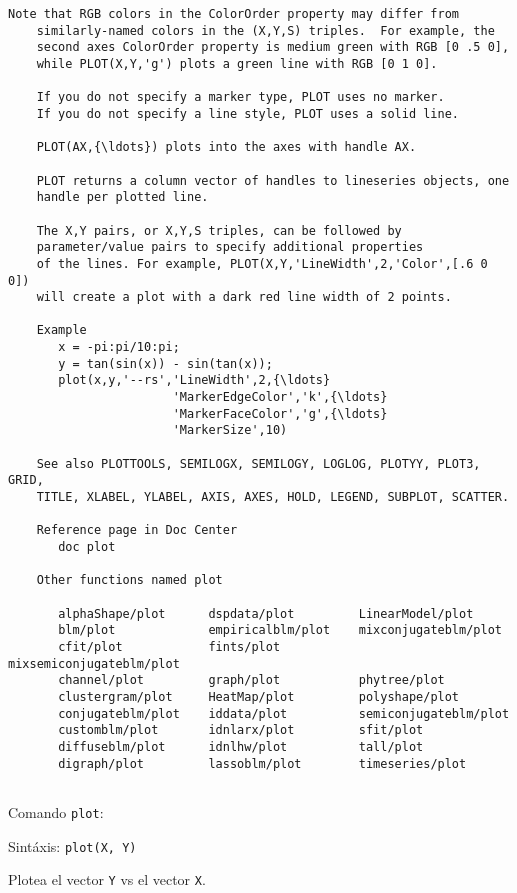 \documentclass[11pt]{article}
\begin{document}
\begin{Verbatim}[commandchars=\\\{\}]
    Note that RGB colors in the ColorOrder property may differ from
    similarly-named colors in the (X,Y,S) triples.  For example, the 
    second axes ColorOrder property is medium green with RGB [0 .5 0],
    while PLOT(X,Y,'g') plots a green line with RGB [0 1 0].
 
    If you do not specify a marker type, PLOT uses no marker. 
    If you do not specify a line style, PLOT uses a solid line.
 
    PLOT(AX,{\ldots}) plots into the axes with handle AX.
 
    PLOT returns a column vector of handles to lineseries objects, one
    handle per plotted line. 
 
    The X,Y pairs, or X,Y,S triples, can be followed by 
    parameter/value pairs to specify additional properties 
    of the lines. For example, PLOT(X,Y,'LineWidth',2,'Color',[.6 0 0]) 
    will create a plot with a dark red line width of 2 points.
 
    Example
       x = -pi:pi/10:pi;
       y = tan(sin(x)) - sin(tan(x));
       plot(x,y,'--rs','LineWidth',2,{\ldots}
                       'MarkerEdgeColor','k',{\ldots}
                       'MarkerFaceColor','g',{\ldots}
                       'MarkerSize',10)
 
    See also PLOTTOOLS, SEMILOGX, SEMILOGY, LOGLOG, PLOTYY, PLOT3, GRID,
    TITLE, XLABEL, YLABEL, AXIS, AXES, HOLD, LEGEND, SUBPLOT, SCATTER.

    Reference page in Doc Center
       doc plot

    Other functions named plot

       alphaShape/plot      dspdata/plot         LinearModel/plot
       blm/plot             empiricalblm/plot    mixconjugateblm/plot
       cfit/plot            fints/plot           mixsemiconjugateblm/plot
       channel/plot         graph/plot           phytree/plot
       clustergram/plot     HeatMap/plot         polyshape/plot
       conjugateblm/plot    iddata/plot          semiconjugateblm/plot
       customblm/plot       idnlarx/plot         sfit/plot
       diffuseblm/plot      idnlhw/plot          tall/plot
       digraph/plot         lassoblm/plot        timeseries/plot


    \end{Verbatim}

    Comando \texttt{plot}:

Sintáxis: \texttt{plot(X,\ Y)}

Plotea el vector \texttt{Y} vs el vector \texttt{X}.
\end{document}
